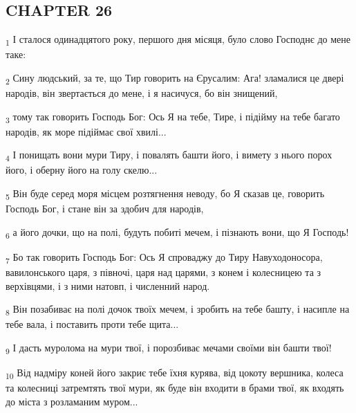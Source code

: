 \subsection{CHAPTER 26}
\begin{tcolorbox}
\textsubscript{1} І сталося одинадцятого року, першого дня місяця, було слово Господнє до мене таке:
\end{tcolorbox}
\begin{tcolorbox}
\textsubscript{2} Сину людський, за те, що Тир говорить на Єрусалим: Ага! зламалися це двері народів, він звертається до мене, і я насичуся, бо він знищений,
\end{tcolorbox}
\begin{tcolorbox}
\textsubscript{3} тому так говорить Господь Бог: Ось Я на тебе, Тире, і підійму на тебе багато народів, як море підіймає свої хвилі...
\end{tcolorbox}
\begin{tcolorbox}
\textsubscript{4} І понищать вони мури Тиру, і повалять башти його, і вимету з нього порох його, і оберну його на голу скелю...
\end{tcolorbox}
\begin{tcolorbox}
\textsubscript{5} Він буде серед моря місцем розтягнення неводу, бо Я сказав це, говорить Господь Бог, і стане він за здобич для народів,
\end{tcolorbox}
\begin{tcolorbox}
\textsubscript{6} а його дочки, що на полі, будуть побиті мечем, і пізнають вони, що Я Господь!
\end{tcolorbox}
\begin{tcolorbox}
\textsubscript{7} Бо так говорить Господь Бог: Ось Я спроваджу до Тиру Навуходоносора, вавилонського царя, з півночі, царя над царями, з конем і колесницею та з верхівцями, і з ними натовп, і численний народ.
\end{tcolorbox}
\begin{tcolorbox}
\textsubscript{8} Він позабиває на полі дочок твоїх мечем, і зробить на тебе башту, і насипле на тебе вала, і поставить проти тебе щита...
\end{tcolorbox}
\begin{tcolorbox}
\textsubscript{9} І дасть муролома на мури твої, і порозбиває мечами своїми він башти твої!
\end{tcolorbox}
\begin{tcolorbox}
\textsubscript{10} Від надміру коней його закриє тебе їхня курява, від цокоту вершника, колеса та колесниці затремтять твої мури, як буде він входити в брами твої, як входять до міста з розламаним муром...
\end{tcolorbox}
